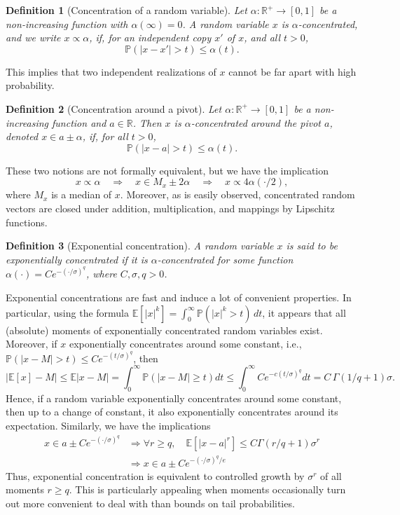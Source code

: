 \documentclass[12pt]{article}
\newtheorem{definition}{Definition}
\begin{document}
\begin{definition}[Concentration of a random variable]
Let $\alpha : \mathbb{R}^+ \rightarrow [0,1]$ be a non-increasing function with $\alpha(\infty) = 0$. A random variable $x$ is $\alpha$-concentrated, and we write $x \propto \alpha$, if, for an independent copy $x'$ of $x$, and all $t > 0$,
$$
\mathbb{P}(|x - x'| > t) \leq \alpha(t).
$$
\end{definition}
This implies that two independent realizations of $x$ cannot be far apart with high probability.
\begin{definition}[Concentration around a pivot]
Let $\alpha : \mathbb{R}^+ \rightarrow [0,1]$ be a non-increasing function and $a \in \mathbb{R}$. Then $x$ is $\alpha$-concentrated around the pivot $a$, denoted $x \in a \pm \alpha$, if, for all $t > 0$,
$$
\mathbb{P}(|x - a| > t) \leq \alpha(t).
$$
\end{definition}
These two notions are not formally equivalent, but we have the implication
$$
x \propto \alpha \quad \Rightarrow \quad x \in M_x \pm 2\alpha \quad \Rightarrow \quad x \propto 4\alpha(\cdot / 2),
$$
where $M_x$ is a median of $x$. Moreover, as is easily observed, concentrated random vectors are closed under addition, multiplication, and mappings by Lipschitz functions.

\begin{definition}[Exponential concentration]
A random variable $ x $ is said to be exponentially concentrated if it is $ \alpha $-concentrated for some function $\alpha(\cdot) = C e^{-\left( \cdot/\sigma \right)^q}$, where $ C, \sigma, q > 0 $.
\end{definition}
Exponential concentrations are fast and induce a lot of convenient properties. In particular, using the formula $\mathbb{E}[|x|^k] = \int_0^{\infty} \mathbb{P}(|x|^k > t) \, dt$, it appears that all (absolute) moments of exponentially concentrated random variables exist. Moreover, if $x$ exponentially concentrates around some constant, i.e., $\mathbb{P}(|x-M|>t)\le Ce^{-(t/\sigma)^q}$, then
\begin{equation*}
\left|\mathbb{E}[x] - M\right|\leq \mathbb{E}|x - M|=\int_0^\infty \mathbb{P}(|x - M| \ge t) dt\le \int_0^\infty Ce^{-c(t/\sigma)^q} dt = C\, \Gamma\left(1/q + 1\right)\sigma.
\end{equation*}
Hence, if a random variable exponentially concentrates around some constant, then up to a change of constant, it also exponentially concentrates around its expectation. Similarly, we have the implications 
\begin{align*}
x \in a \pm Ce^{-(\cdot/\sigma)^q} &\Rightarrow \forall r \geq q, \quad \mathbb{E}[|x - a|^r] \leq C\Gamma(r/q + 1)\sigma^r \\
&\Rightarrow x \in a \pm Ce^{-(\cdot/\sigma)^q/e}
\end{align*}
Thus, exponential concentration is equivalent to controlled growth by $\sigma^r$ of all moments $r \geq q$. This is particularly appealing when moments occasionally turn out more convenient to deal with than bounds on tail probabilities.
\end{document}
